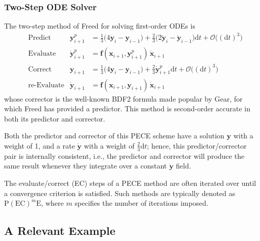 \subsubsection{Two-Step ODE Solver}

The two-step method of Freed \cite{Freed17a} for solving first-order ODEs is
\begin{subequations}
    \label{1stOrderODEs}
    \begin{align}
    \mbox{} & \text{Predict} & 
    \mathbf{y}_{i+1}^p & = \tfrac{1}{3} 
    \bigl( 4 \mathbf{y}_i - \mathbf{y}_{i-1} \bigr) + 
    \tfrac{2}{3} \bigl( 2 \dot{\mathbf{y}}_i - \dot{\mathbf{y}}_{i-1} 
    \bigr) \mathrm{d}t + \mathcal{O} \bigl( (\mathrm{d}t)^3 \bigr)
    \label{1stOrderPredictor} \\
    \mbox{} & \text{Evaluate} & 
    \dot{\mathbf{y}}^p_{i+1} & = \mathbf{f} (\mathbf{x}_{i+1} , \mathbf{y}_{i+1}^p) \, \dot{\mathbf{x}}_{i+1}
    \label{1stOrderEvaluate} \\
    \mbox{} & \text{Correct} &
    \mathbf{y}_{i+1} & = \tfrac{1}{3} 
    \bigl( 4 \mathbf{y}_i - \mathbf{y}_{i-1} \bigr) + 
    \tfrac{2}{3} \dot{\mathbf{y}}^{p}_{i+1} \mathrm{d}t + 
    \mathcal{O} \bigl( (\mathrm{d}t)^3 \bigr)
    \label{1stOrderCorrector} \\
    \mbox{} & \text{re-Evaluate} & 
    \dot{\mathbf{y}}_{i+1} & = \mathbf{f} (\mathbf{x}_{i+1} , \mathbf{y}_{i+1}) \, 
    \dot{\mathbf{x}}_{i+1}
    \label{1stOrderReEvaluate}
    \end{align}
\end{subequations} 
whose corrector is the well-known BDF2 formula made popular by Gear, for which Freed has provided a predictor.  This method is second-order accurate in both its predictor and corrector.

Both the predictor and corrector of this PECE scheme have a solution $\mathbf{y}$ with a weight of 1, and a rate $\dot{\mathbf{y}}$ with a weight of $\tfrac{2}{3} \mathrm{d}t$; hence, this predictor\slash corrector pair is internally consistent, i.e., the predictor and corrector will produce the same result whenever they integrate over a constant $\dot{\mathbf{y}}$ field. 

The evaluate\slash correct (EC) steps of a PECE method are often iterated over until a convergence criterion is satisfied.  Such methods are typically denoted as $\text{P}(\text{EC})^m \text{E}$, where $m$ specifies the number of iterations imposed.


\subsection{A Relevant Example}


